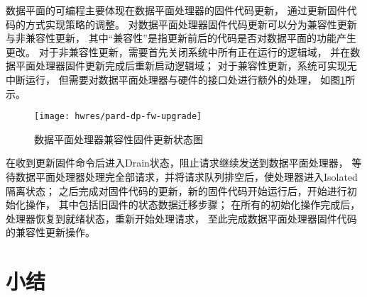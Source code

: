 数据平面的可编程主要体现在数据平面处理器的固件代码更新，
通过更新固件代码的方式实现策略的调整。
对数据平面处理器固件代码更新可以分为兼容性更新与非兼容性更新，
其中``兼容性''是指更新前后的代码是否对数据平面的功能产生更改。
对于非兼容性更新，需要首先关闭系统中所有正在运行的逻辑域，
并在数据平面处理器固件更新完成后重新启动逻辑域；
对于兼容性更新，系统可实现无中断运行，
但需要对数据平面处理器与硬件的接口处进行额外的处理，
如图\ref{fig:pard-dp-fw-upgrade}所示。

\begin{figure}[H]
  \centering
  \texttt{[image: hwres/pard-dp-fw-upgrade]}
  \caption{数据平面处理器兼容性固件更新状态图}
  \label{fig:pard-dp-fw-upgrade}
\end{figure}

在收到更新固件命令后进入Drain状态，阻止请求继续发送到数据平面处理器，
等待数据平面处理器处理完全部请求，并将请求队列排空后，使处理器进入Isolated隔离状态；
之后完成对固件代码的更新，新的固件代码开始运行后，开始进行初始化操作，
其中包括旧固件的状态数据迁移步骤；
在所有的初始化操作完成后，处理器恢复到就绪状态，重新开始处理请求，
至此完成数据平面处理器固件代码的兼容性更新操作。


\section{小结}

